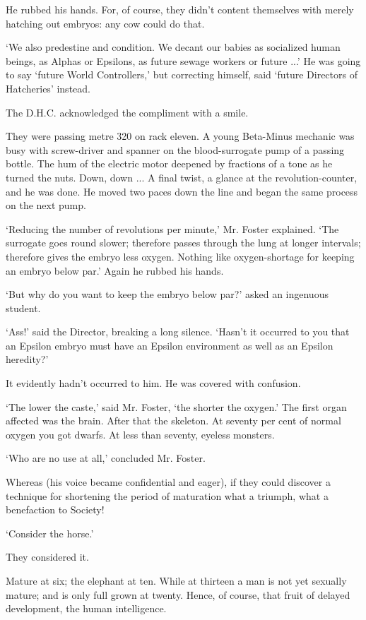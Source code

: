 \documentclass[12pt,a5paper]{book}
\newcommand{\sqm}[1]{‘#1’}
\begin{document}
He rubbed his hands. For, of course, they didn't content themselves with merely hatching out embryos: any cow could do that.

\sqm{We also predestine and condition. We decant our babies as socialized human beings, as Alphas or Epsilons, as future sewage workers or future ...} He was going to say \sqm{future World Controllers,} but correcting himself, said \sqm{future Directors of Hatcheries} instead.

The D.H.C. acknowledged the compliment with a smile.

They were passing metre 320 on rack eleven. A young Beta-Minus mechanic was busy with screw-driver and spanner on the blood-surrogate pump of a passing bottle. The hum of the electric motor deepened by fractions of a tone as he turned the nuts. Down, down ... A final twist, a glance at the revolution-counter, and he was done. He moved two paces down the line and began the same process on the next pump.

\sqm{Reducing the number of revolutions per minute,} Mr. Foster explained. \sqm{The surrogate goes round slower; therefore passes through the lung at longer intervals; therefore gives the embryo less oxygen. Nothing like oxygen-shortage for keeping an embryo below par.} Again he rubbed his hands.

\sqm{But why do you want to keep the embryo below par?} asked an ingenuous student.

\sqm{Ass!} said the Director, breaking a long silence. \sqm{Hasn't it occurred to you that an Epsilon embryo must have an Epsilon environment as well as an Epsilon heredity?}

It evidently hadn't occurred to him. He was covered with confusion.

\sqm{The lower the caste,} said Mr. Foster, \sqm{the shorter the oxygen.} The first organ affected was the brain. After that the skeleton. At seventy per cent of normal oxygen you got dwarfs. At less than seventy, eyeless monsters.

\sqm{Who are no use at all,} concluded Mr. Foster.

Whereas (his voice became confidential and eager), if they could discover a technique for shortening the period of maturation what a triumph, what a benefaction to Society!

\sqm{Consider the horse.}

They considered it.

Mature at six; the elephant at ten. While at thirteen a man is not yet sexually mature; and is only full grown at twenty. Hence, of course, that fruit of delayed development, the human intelligence.
\end{document}

